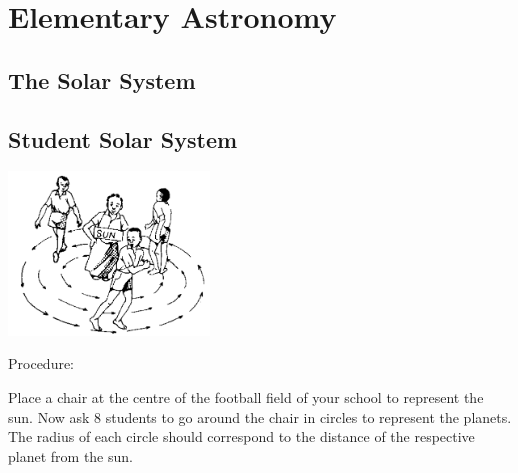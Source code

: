 \section{Elementary Astronomy}

\begin{multicols}{2}


\section*{The Solar System}


\subsection{Student Solar System}

\begin{center}
\includegraphics[width=0.4\textwidth]{./img/source/student-solar-system.png}
\end{center}

\begin{description*}
\item[Procedure:]{Place a chair at the centre of the football field of your school to represent the sun. Now ask 8 students to go around the chair in circles to represent the planets. The radius of each circle should correspond to the distance of the respective planet from the sun.

}
\end{description*}
\end{multicols}
